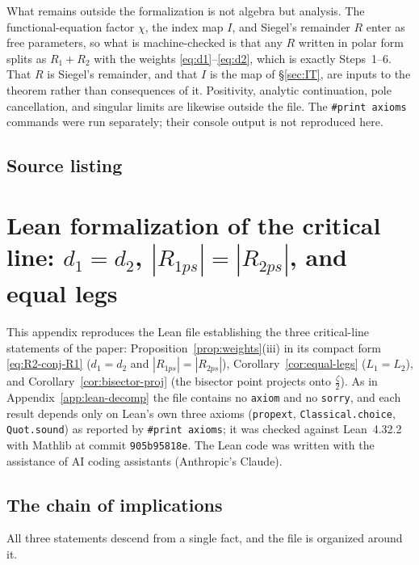 \documentclass[11pt]{article}
\theoremstyle{definition}
\begin{document}
What remains outside the formalization is not algebra but analysis. The
functional-equation factor $\chi$, the index map $I$, and Siegel's remainder $R$
enter as free parameters, so what is machine-checked is that any $R$ written in
polar form splits as $R_{1}+R_{2}$ with the weights
\eqref{eq:d1}--\eqref{eq:d2}, which is exactly Steps~1--6. That $R$ is Siegel's
remainder, and that $I$ is the map of \S\ref{sec:IT}, are inputs to the
theorem rather than consequences of it. Positivity, analytic continuation,
pole cancellation, and singular limits are likewise outside the file.
The \texttt{\#print axioms} commands were run separately; their console
output is not reproduced here.

\subsection{Source listing}



\section{Lean formalization of the critical line: \texorpdfstring{$d_1=d_2$, $|R_{1ps}|=|R_{2ps}|$, and equal legs}{d1 = d2, |R1ps| = |R2ps|, and equal legs}}
\label{app:lean-critical}

This appendix reproduces the Lean file establishing the three critical-line
statements of the paper: Proposition~\ref{prop:weights}(iii) in its compact
form \eqref{eq:R2-conj-R1} ($d_1=d_2$ and $|R_{1ps}|=|R_{2ps}|$),
Corollary~\ref{cor:equal-legs}
($L_1=L_2$), and Corollary~\ref{cor:bisector-proj} (the bisector point projects
onto $\tfrac{\zeta}{2}$). As in Appendix~\ref{app:lean-decomp} the file contains
no \texttt{axiom} and no \texttt{sorry}, and each result depends only on Lean's
own three axioms (\texttt{propext}, \texttt{Classical.choice},
\texttt{Quot.sound}) as reported by \texttt{\#print axioms}; it was checked
against Lean~4.32.2 with Mathlib at commit \texttt{905b95818e}. The Lean code was
written with the assistance of AI coding assistants (Anthropic's Claude).

\subsection{The chain of implications}

All three statements descend from a single fact, and the file is organized around
it.
\end{document}
